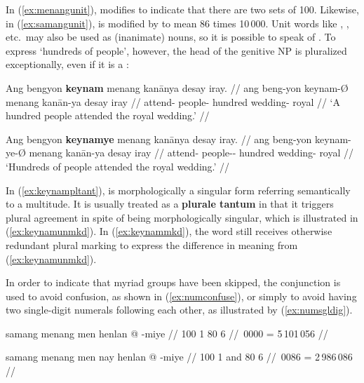 \xe

In (\ref{ex:menangunit}),  modifies  to 
indicate that there are two sets of 100. Likewise, in 
(\ref{ex:samangunit}),  is modified by 
 to mean 86 times 10\,000.
Unit words like , , etc.\ may also be 
used as (inanimate) nouns, so it is possible to speak of  
 \label{hundreds}. To express `hundreds of
people', however, the head of the genitive NP is pluralized exceptionally, even
if it is a :

\pex\label{ex:keynampltant}
\a\label{ex:keynamunmkd}\begingl
	\gla Ang bengyon \textbf{keynam} menang kanānya {desay iray}. //
	\glb ang beng-yon keynam-Ø menang kanān-ya {desay iray} //
	\glc \AgtT{} attend-\TplN{} people-\Top{} hundred wedding-\Loc{} 
		royal //
	\glft `A hundred people attended the royal wedding.' //
\endgl

\a\label{ex:keynammkd}\begingl
	\gla Ang bengyon \textbf{keynamye} menang kanānya {desay iray}. //
	\glb ang beng-yon keynam-ye-Ø menang kanān-ya {desay iray} //
	\glc \AgtT{} attend-\TplN{} people-\Pl{}-\Top{} hundred wedding-\Loc{} 
		royal //
	\glft `Hundreds of people attended the royal wedding.' //
\endgl

\xe

In (\ref{ex:keynampltant}),  is morphologically a
singular form referring semantically to a multitude. It is usually treated as
a \textbf{plurale tantum} in that it triggers plural agreement in spite of
being morphologically singular, which is illustrated in
(\ref{ex:keynamunmkd}). In (\ref{ex:keynammkd}), the word still receives
otherwise redundant plural marking to express the difference in meaning from
(\ref{ex:keynamunmkd}).

In order to indicate that myriad groups have been skipped, the conjunction
 is used to avoid confusion, as shown in
(\ref{ex:numconfuse}), or simply to avoid having two single-digit numerals
following each other, as illustrated by (\ref{ex:numsgldig}).

\pex[glwordalign=center]\label{ex:numconfuse}
\a\begingl
	\gla samang menang men henlan @ -miye //
	 {100} {1} {80} {6} //
	\,0000 = 5\,101\,056 //
\endgl

\a\begingl
	\gla samang menang men nay henlan @ -miye //
	 {100} {1} and {80} {6} //
	\,0086 = 2\,986\,086 //
\endgl

